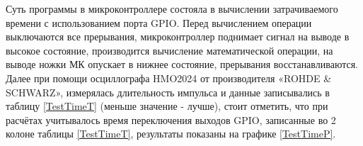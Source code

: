 Суть программы в микроконтроллере состояла в вычислении затрачиваемого времени с использованием порта GPIO. Перед вычислением операции выключаются все прерывания, микроконтроллер поднимает сигнал на выводе в высокое состояние, производится вычисление математической операции, на выводе ножки МК опускает в нижнее состояние, прерывания восстанавливаются. Далее при помощи осциллографа HMO2024 от производителя «ROHDE \& SCHWARZ», измерялась длительность импульса и данные записывались в таблицу \ref{TestTimeT} (меньше значение - лучше), стоит отметить, что при расчётах учитывалось время переключения выходов GPIO, записанные во 2 колоне таблицы \ref{TestTimeT}, результаты показаны на графике \ref{TestTimeP}.







